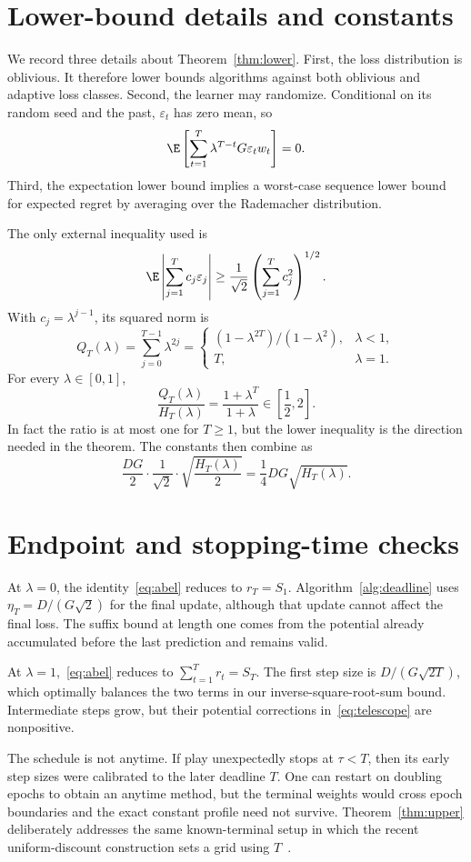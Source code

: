 \documentclass{article}
\begin{document}
\section{Lower-bound details and constants}
\label{app:lower}

We record three details about Theorem~\ref{thm:lower}. First, the loss distribution is oblivious. It therefore lower bounds algorithms against both oblivious and adaptive loss classes. Second, the learner may randomize. Conditional on its random seed and the past, $\varepsilon_t$ has zero mean, so \[ \E\left[\sum_{t=1}^T\lambda^{T-t}G\varepsilon_tw_t\right]=0. \] Third, the expectation lower bound implies a worst-case sequence lower bound for expected regret by averaging over the Rademacher distribution.

The only external inequality used is \[ \E\left|\sum_{j=1}^Tc_j\varepsilon_j\right|\ge\frac1{\sqrt2}\left(\sum_{j=1}^Tc_j^2\right)^{1/2}. \] With $c_j=\lambda^{j-1}$, its squared norm is \[ Q_T(\lambda)=\sum_{j=0}^{T-1}\lambda^{2j}=
\begin{cases}
(1-\lambda^{2T})/(1-\lambda^2),&\lambda<1,\\
T,&\lambda=1.
\end{cases}
\] For every $\lambda\in[0,1]$, \[ \frac{Q_T(\lambda)}{H_T(\lambda)}=\frac{1+\lambda^T}{1+\lambda}\in\left[\frac12,2\right]. \] In fact the ratio is at most one for $T\ge1$, but the lower inequality is the direction needed in the theorem. The constants then combine as \[ \frac{DG}{2}\cdot\frac1{\sqrt2}\cdot\sqrt{\frac{H_T(\lambda)}2}=\frac14DG\sqrt{H_T(\lambda)}. \]

\section{Endpoint and stopping-time checks}
\label{app:endpoints}

At $\lambda=0$, the identity~\eqref{eq:abel} reduces to $r_T=S_1$. Algorithm~\ref{alg:deadline} uses $\eta_T=D/(G\sqrt2)$ for the final update, although that update cannot affect the final loss. The suffix bound at length one comes from the potential already accumulated before the last prediction and remains valid.

At $\lambda=1$,~\eqref{eq:abel} reduces to $\sum_{t=1}^Tr_t=S_T$. The first step size is $D/(G\sqrt{2T})$, which optimally balances the two terms in our inverse-square-root-sum bound. Intermediate steps grow, but their potential corrections in~\eqref{eq:telescope} are nonpositive.

The schedule is not anytime. If play unexpectedly stops at $\tau<T$, then its early step sizes were calibrated to the later deadline $T$. One can restart on doubling epochs to obtain an anytime method, but the terminal weights would cross epoch boundaries and the exact constant profile need not survive. Theorem~\ref{thm:upper} deliberately addresses the same known-terminal setup in which the recent uniform-discount construction sets a grid using $T$~\citep{yang2026uniform}.
\end{document}
